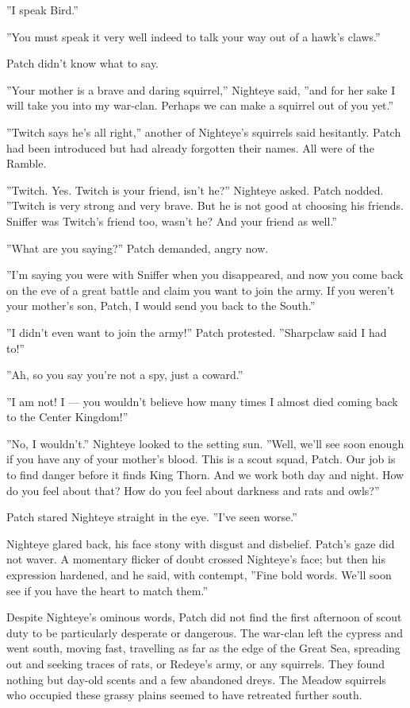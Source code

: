 \documentclass[12pt]{book}
\begin{document}
''I speak Bird.''

''You must speak it very well indeed to talk your way out of a hawk's claws.''

Patch didn't know what to say.

''Your mother is a brave and daring squirrel,'' Nighteye said, ''and for her sake I will take you into my war-clan. Perhaps we can make a squirrel out of you yet.''

''Twitch says he's all right,'' another of Nighteye's squirrels said hesitantly. Patch had been introduced but had already forgotten their names. All were of the Ramble.

''Twitch. Yes. Twitch is your friend, isn't he?'' Nighteye asked. Patch nodded. ''Twitch is very strong and very brave. But he is not good at choosing his friends. Sniffer was Twitch's friend too, wasn't he? And your friend as well.''

''What are you saying?'' Patch demanded, angry now.

''I'm saying you were with Sniffer when you disappeared, and now you come back on the eve of a great battle and claim you want to join the army. If you weren't your mother's son, Patch, I would send you back to the South.''

''I didn't even want to join the army!'' Patch protested. ''Sharpclaw said I had to!''

''Ah, so you say you're not a spy, just a coward.''

''I am not! I ---
you wouldn't believe how many times I almost died coming back to the Center Kingdom!''

''No, I wouldn't.'' Nighteye looked to the setting sun. ''Well, we'll see soon enough if you have any of your mother's blood. This is a scout squad, Patch. Our job is to find danger before it finds King Thorn. And we work both day and night. How do you feel about that? How do you feel about darkness and rats and owls?''

Patch stared Nighteye straight in the eye. ''I've seen worse.''

Nighteye glared back, his face stony with disgust and disbelief. Patch's gaze did not waver. A momentary flicker of doubt crossed Nighteye's face; but then his expression hardened, and he said, with contempt, ''Fine bold words. We'll soon see if you have the heart to match them.''

Despite Nighteye's ominous words, Patch did not find the first afternoon of scout duty to be particularly desperate or dangerous. The war-clan left the cypress and went south, moving fast, travelling as far as the edge of the Great Sea, spreading out and seeking traces of rats, or Redeye's army, or any squirrels. They found nothing but day-old scents and a few abandoned dreys. The Meadow squirrels who occupied these grassy plains seemed to have retreated further south.
\end{document}
